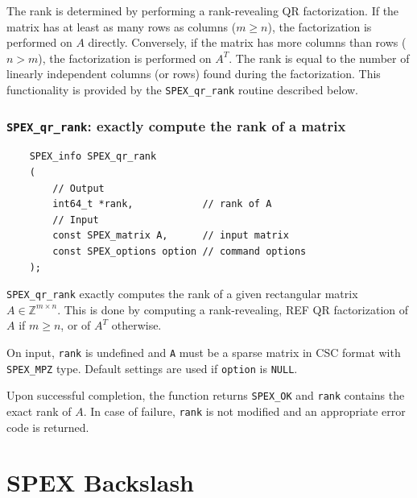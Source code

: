 \documentclass[12pt,oneside]{book}
\theoremstyle{definition}
\begin{document}
The rank is determined by performing a rank-revealing QR factorization. If the
matrix has at least as many rows as columns ($m \geq n$), the factorization is
performed on $A$ directly. Conversely, if the matrix has more columns than rows
($n > m$), the factorization is performed on $A^T$. The rank is equal to the
number of linearly independent columns (or rows) found during the
factorization. This functionality is provided by the \verb|SPEX_qr_rank|
routine described below.

\subsection{\texttt{SPEX\_qr\_rank}: exactly compute the rank of a matrix}
\begin{mdframed}[userdefinedwidth=\textwidth]
{\footnotesize
\begin{verbatim}
    SPEX_info SPEX_qr_rank
    (
        // Output
        int64_t *rank,            // rank of A
        // Input
        const SPEX_matrix A,      // input matrix
        const SPEX_options option // command options
    );
\end{verbatim}
} \end{mdframed}

\verb|SPEX_qr_rank| exactly computes the rank of a given rectangular matrix $A
\in \mathbb{Z}^{m \times n}$.  This is done by computing a rank-revealing,  REF
QR factorization of $A$ if $m \ge n$, or of $A^T$ otherwise.

On input, \verb|rank| is undefined and \verb|A| must be a sparse matrix in CSC
format with \verb|SPEX_MPZ| type. Default settings are used if \verb|option| is
\verb|NULL|.

Upon successful completion, the function returns \verb|SPEX_OK| and \verb|rank|
contains the exact rank of $A$. In case of failure, \verb|rank| is not modified
and an appropriate error code is returned.



\chapter{SPEX Backslash}\vspace{-0.75in} \label{ch:Backslash}
\end{document}
